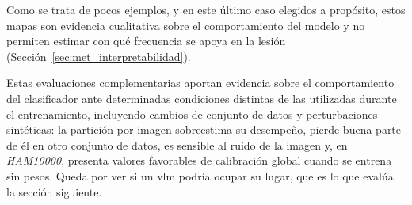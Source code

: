 Como se trata de pocos ejemplos, y en este último caso elegidos a propósito, estos mapas son evidencia cualitativa sobre el
comportamiento del modelo y no permiten estimar con qué frecuencia se apoya en la lesión
(Sección~\ref{sec:met_interpretabilidad}).

Estas evaluaciones complementarias aportan evidencia sobre el comportamiento del clasificador ante determinadas condiciones distintas de las utilizadas durante el entrenamiento, incluyendo cambios de conjunto de datos y perturbaciones sintéticas: la partición por imagen sobreestima su desempeño, pierde buena parte de él en otro conjunto de datos, es sensible al ruido de la imagen y, en \emph{HAM10000}, presenta valores favorables de calibración global cuando se entrena sin pesos. Queda por ver si un \gls{vlm} podría ocupar su lugar, que es
lo que evalúa la sección siguiente.
